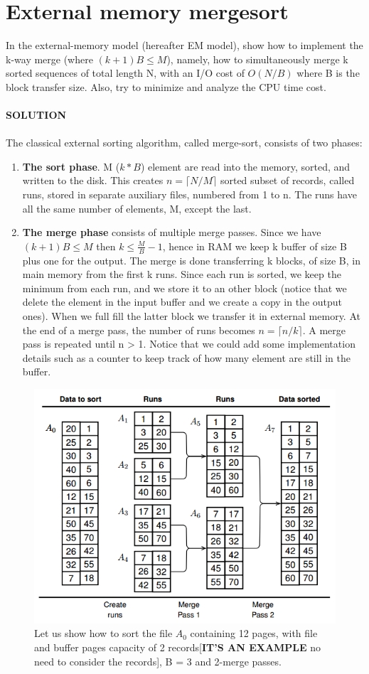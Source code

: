 \documentclass[a4paper]{article}
\begin{document}
\section*{External memory mergesort}
In the external-memory model (hereafter EM model),
show how to implement the k-way merge (where $(k + 1)B \leq M$), namely, how to
simultaneously merge k sorted sequences of total length N, with an I/O cost of $O(N/B)$
where B is the block transfer size. Also, try to minimize and analyze the CPU time
cost.
\\
\\
\textbf{SOLUTION}
\\
\\
The classical external sorting algorithm, called merge-sort, consists of two phases:
\begin{enumerate}
\item \textbf{The sort phase}. M ($k*B$) element are read into the memory, sorted, and written to the
disk. This creates $n =\lceil N/M \rceil$ sorted subset of records, called runs, stored
in separate auxiliary files, numbered from 1 to n. The runs have all the same
number of elements, M, except the last.
\item \textbf{The merge phase} consists of multiple merge passes. Since we have $(k + 1)B \leq M$ then $k\leq \frac{M}{B}-1$, hence in RAM we keep k buffer of size B plus one for the output. The merge is done transferring k blocks, of size B, in main memory from the first k runs. Since each run is sorted, we keep the minimum from each run, and we store it to an other block (notice that we delete the element in the input buffer and we create a copy in the output ones). When we full fill the latter block we transfer it in external memory. At the end of a merge pass, the number of runs becomes $n=\lceil n/k \rceil$. A merge pass is repeated until
n > 1. Notice that we could add some implementation details such as a counter to keep track of how many element are still in the buffer.
\end{enumerate}
\begin{figure}[H]
\centering
\includegraphics[scale=0.4]{kway.png}
\caption{Let us show how to sort the file $A_0$ containing 12 pages, with file and buffer pages
capacity of 2 records[\textbf{IT'S AN EXAMPLE} no need to consider the records], B = 3 and 2-merge passes.}
\end{figure}
\end{document}
